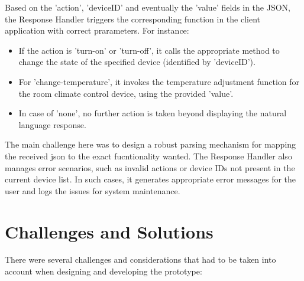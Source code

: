 Based on the 'action', 'deviceID' and eventually the 'value' fields in the JSON, the Response Handler triggers the corresponding function in the client application with correct prarameters. For instance:

\begin{itemize}
\item If the action is 'turn-on' or 'turn-off', it calls the appropriate method to change the state of the specified device (identified by 'deviceID').
\item For 'change-temperature', it invokes the temperature adjustment function for the room climate control device, using the provided 'value'.
\item In case of 'none', no further action is taken beyond displaying the natural language response.
\end{itemize}

The main challenge here was to design a robust parsing mechanism for mapping the received json to the exact fucntionality wanted.
The Response Handler also manages error scenarios, such as invalid actions or device IDs not present in the current device list. In such cases, it generates appropriate error messages for the user and logs the issues for system maintenance.

\section{Challenges and Solutions}
\label{sec:challenges-solutions}
There were several challenges and considerations that had to be taken into account when designing and developing the prototype:

